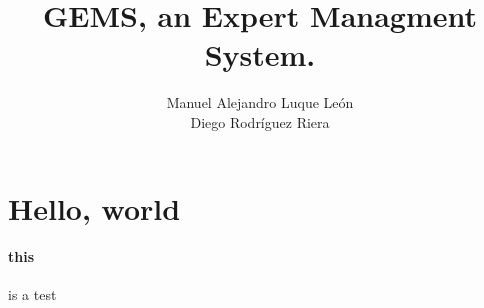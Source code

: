 \documentclass[a4paper,10pt]{article}
\title{GEMS, an Expert Managment System.}
\author{Manuel Alejandro Luque León\\Diego Rodríguez Riera}
\begin{document}
\maketitle
\pagebreak
\tableofcontents
\pagebreak

\section{Hello, world}
\paragraph{this}is a test
\end{document}
